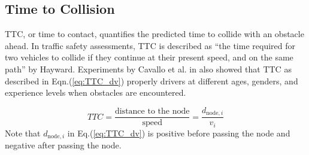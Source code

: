 \subsection{Time to Collision}

\ac*{TTC}, or time to contact, quantifies the predicted time to collide with an obstacle ahead\cite{Caird1994}. In traffic safety assessments, TTC is described as “the time required for two vehicles to collide if they continue at their present speed, and on the same path” by Hayward\cite{Hayward1972}. Experiments by Cavallo et al. in \cite{TTC} also showed that TTC as described in Eqn.(\ref{eq:TTC_dv}) properly drivers at different ages, genders, and experience levels when obstacles are encountered. 

\begin{equation}
TTC = \frac{\text{distance to the node}}{\text{speed}}=\frac{{d_{\mathrm{node},i}}}{v_i}
\label{eq:TTC_dv}
\end{equation}
Note that $d_{\mathrm{node},i}$ in Eq.(\ref{eq:TTC_dv}) is positive before passing the node and negative after passing the node.





